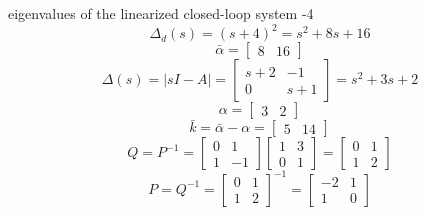 \begin{enumerate}
    eigenvalues of the linearized closed-loop system -4\\
    \begin{equation}
      \Delta_d(s) = (s+4)^2 = s^2 + 8s + 16
    \end{equation}
    \begin{equation}
      \bar \alpha = \begin{bmatrix} 8 & 16 \end{bmatrix}
    \end{equation}
    \begin{equation}
      \Delta(s) = \vert sI - A \vert =
      \begin{bmatrix}
        s+2 & -1 \\
        0 & s+1
      \end{bmatrix} = s^2 + 3s + 2
    \end{equation}
    \begin{equation}
      \alpha = \begin{bmatrix}3 & 2\end{bmatrix}
    \end{equation}
    \begin{equation}
      \bar k = \bar \alpha - \alpha = \begin{bmatrix}5 & 14\end{bmatrix}
    \end{equation}
    \begin{equation}
      Q = P^{-1} =
      \begin{bmatrix}
        0 & 1 \\
        1 & -1
      \end{bmatrix}
      \begin{bmatrix}
        1 & 3 \\
        0 & 1 
      \end{bmatrix} =
      \begin{bmatrix}
        0 & 1 \\
        1 & 2
      \end{bmatrix}
    \end{equation}
    \begin{equation}
      P = Q^{-1} = 
      \begin{bmatrix}
        0 & 1 \\
        1 & 2
      \end{bmatrix}^{-1} =
      \begin{bmatrix}
        -2 & 1 \\
        1 & 0
      \end{bmatrix}

\end{equation}
\end{enumerate}
